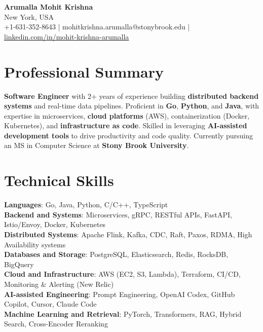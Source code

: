 \documentclass[letterpaper,11pt]{article}
\begin{document}
\begin{center}
  {\Large \textbf{Arumalla Mohit Krishna}} \\
  New York, USA \\
  +1-631-352-8643 \enspace | \enspace mohitkrishna.arumalla@stonybrook.edu \enspace | \enspace \href{https://www.linkedin.com/in/mohit-krishna-arumalla}{linkedin.com/in/mohit-krishna-arumalla}
\end{center}

\section{Professional Summary}
  \begin{itemize}[leftmargin=0.15in, label={}]
    \small{\item{
     \textbf{Software Engineer} with 2+ years of experience building \textbf{distributed backend systems} and real-time data pipelines. Proficient in \textbf{Go}, \textbf{Python}, and \textbf{Java}, with expertise in microservices, \textbf{cloud platforms} (AWS), containerization (Docker, Kubernetes), and \textbf{infrastructure as code}. Skilled in leveraging \textbf{AI-assisted development tools} to drive productivity and code quality. Currently pursuing an MS in Computer Science at \textbf{Stony Brook University}.
    }}
  \end{itemize}
\vspace{-16pt}

\section{Technical Skills}
 \begin{itemize}[leftmargin=0.15in, label={}]
    \small{\item{
     \textbf{Languages}: Go, Java, Python, C/C++, TypeScript \\
     \textbf{Backend and Systems}: Microservices, gRPC, RESTful APIs, FastAPI, Istio/Envoy, Docker, Kubernetes \\
     \textbf{Distributed Systems}: Apache Flink, Kafka, CDC, Raft, Paxos, RDMA, High Availability systems \\
     \textbf{Databases and Storage}: PostgreSQL, Elasticsearch, Redis, RocksDB, BigQuery \\
     \textbf{Cloud and Infrastructure}: AWS (EC2, S3, Lambda), Terraform, CI/CD, Monitoring & Alerting (New Relic) \\
     \textbf{AI-assisted Engineering}: Prompt Engineering, OpenAI Codex, GitHub Copilot, Cursor, Claude Code \\
     \textbf{Machine Learning and Retrieval}: PyTorch, Transformers, RAG, Hybrid Search, Cross-Encoder Reranking
    }}
 \end{itemize}
\vspace{-16pt}
\end{document}
